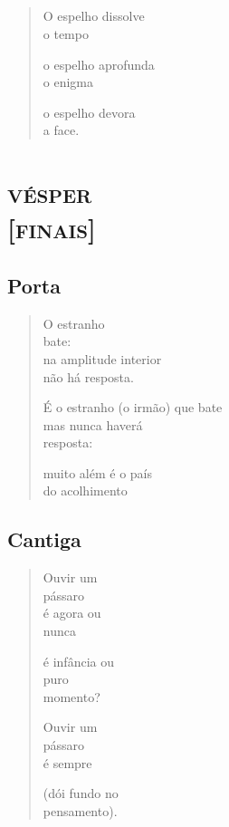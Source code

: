 \chapter*{}
\begin{verse}
O espelho dissolve\\
o tempo

o espelho aprofunda\\
o enigma

o espelho devora\\
a face.
\end{verse}

\part*{\textsc{vésper}\\ {[}\textsc{finais}{]}}

\chapter{Porta}

\begin{verse}
O estranho\\
bate:\\
na amplitude interior\\
não há resposta.

É o estranho (o irmão) que bate\\
mas nunca haverá\\
resposta:

muito além é o país\\
do acolhimento
\end{verse}

\chapter{Cantiga}

\begin{verse}
Ouvir um\\
pássaro\\
é agora ou\\
nunca

é infância ou\\
puro\\
momento?

Ouvir um\\
pássaro\\
é sempre

(dói fundo no\\
pensamento).
\end{verse}

